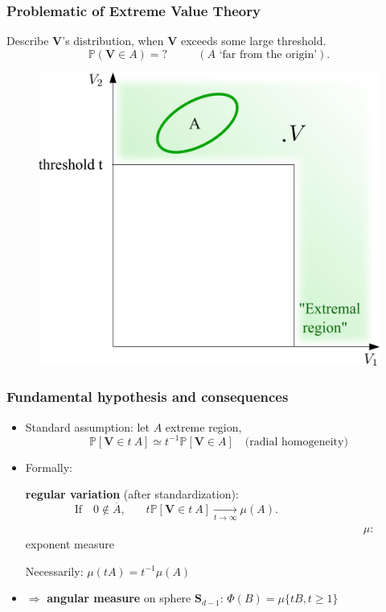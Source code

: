 \documentclass[9pt]{beamer}
\def\mb{\mathbf}
\begin{document}
\begin{frame}
\frametitle{Problematic of Extreme Value Theory}
\vspace{0.2cm}
Describe $\mb V$'s distribution, when $\mb V$ exceeds some large threshold.
\vspace{0.2cm}
    $$
    \mathbb{P}(\mb V\in A) = \text{?} ~~~~~~~~~~~~ (A  \text{ `far from the origin'}).
    $$
  \begin{figure}
    \centering
    \includegraphics[scale=0.3]{sourcefigs/application4.png}
  \end{figure}
\end{frame}

\begin{frame}
  \frametitle{Fundamental hypothesis and consequences}%

  \begin{itemize}
\item Standard assumption: let $A$ extreme region, $$\mathbb{P}[\mb V\in t~A] \simeq t^{-1}\mathbb{P}[\mb V\in A] \quad \text{(radial homogeneity)} $$ 
\item Formally:
\begin{exampleblock}{\textbf{regular variation} (after standardization):}
  $$\text{If~~~} 0 \notin \overline A,~~~~~~~~ t \mathbb{P}[\mb V\in t~A]\xrightarrow[t\to\infty]{} \mu(A). ~~~~~~~~~~~~~~~~~~~~~~~~~~~~~~~~~~$$
~~~~~~~~~~~~~~~~~~~~~~~~~~~~~~~~~~~~~~~~~~~~~~~~~~~~~~~~~~~~$\mu$: exponent measure

\end{exampleblock}
   Necessarily: $\mu(tA) = t^{-1} \mu(A)$ 

\vspace*{1cm}
\item
 $\Rightarrow $ \textbf{angular measure} on sphere $\mb S_{d-1}$: 
    $ \Phi(B) =\mu\{t B, t\ge 1\} %
    $ 
\end{itemize}
\end{frame}
\end{document}
